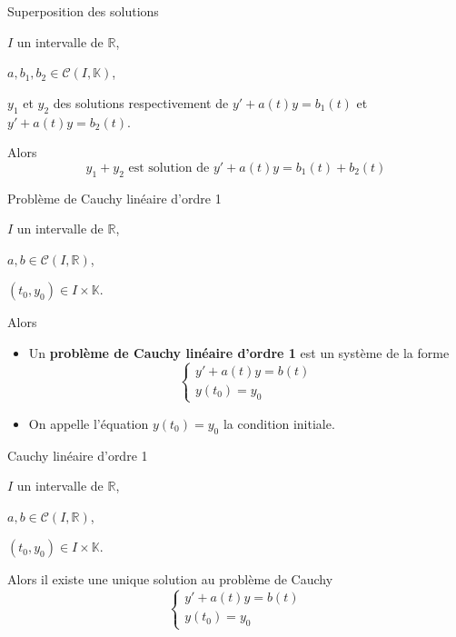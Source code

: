     \begin{theo}{Superposition des solutions}{}
        \begin{soient}
            \item $I$ un intervalle de $\mathbb{R}$,
            \item $a,b_1,b_2 \in \mathcal{C}(I,\mathbb{K})$,
            \item $y_1$ et $y_2$ des solutions respectivement de $y' + a(t)y = b_1(t)$ et $y' + a(t)y = b_2(t)$.
        \end{soient}
        Alors 
        \[ y_1 + y_2 \text{ est solution de } y' + a(t)y = b_1(t) + b_2(t) \]
    \end{theo}

    \begin{defi}{Problème de Cauchy linéaire d’ordre 1}{}
        \begin{soient}
            \item $I$ un intervalle de $\mathbb{R}$,
            \item $a,b \in \mathcal{C}(I,\mathbb{R})$,
            \item $(t_0,y_0) \in I \times \mathbb{K}$.
        \end{soient}
        Alors
        \begin{itemize}
            \item Un \textbf{problème de Cauchy linéaire d’ordre 1} est un système de la forme \[ \left\{ \begin{array}{l}
                y' + a(t)y = b(t)\\
                y(t_0) = y_0
                \end{array} \right. \]
            \item On appelle l’équation $y(t_0) = y_0$ la condition initiale.
        \end{itemize}
    \end{defi}
    
    \begin{theo}{Cauchy linéaire d’ordre 1}{}
        \begin{soient}
            \item $I$ un intervalle de $\mathbb{R}$,
            \item $a,b \in \mathcal{C}(I,\mathbb{R})$,
            \item $(t_0,y_0) \in I \times \mathbb{K}$.
        \end{soient}
        Alors il existe une unique solution au problème de Cauchy \[ \left\{ \begin{array}{ll}
        y' + a(t)y = b(t)\\
        y(t_0) = y_0
        \end{array} \right. \]
    \end{theo}

